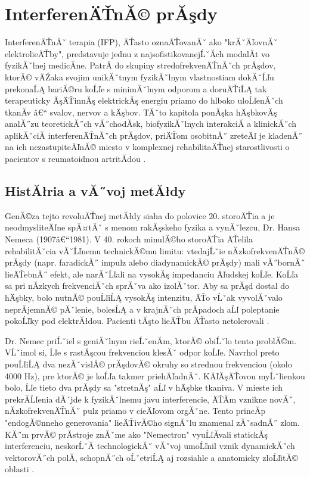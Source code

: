 ﻿\chapter{InterferenÄŤnĂ© prĂşdy}

InterferenÄŤnĂˇ terapia (IFP), ÄŤasto oznaÄŤovanĂˇ ako "krĂˇÄľovnĂˇ elektrolieÄŤby", predstavuje jednu z najsofistikovanejĹˇĂ­ch modalĂ­t vo fyzikĂˇlnej medicĂ­ne. PatrĂ­ do skupiny stredofrekvenÄŤnĂ˝ch prĂşdov, ktorĂ© vÄŹaka svojim unikĂˇtnym fyzikĂˇlnym vlastnostiam dokĂˇĹľu prekonaĹĄ bariĂ©ru koĹľe s minimĂˇlnym odporom a doruÄŤiĹĄ tak terapeuticky ĂşÄŤinnĂş elektrickĂş energiu priamo do hlboko uloĹľenĂ˝ch tkanĂ­v â€“ svalov, nervov a kÄşbov. TĂˇto kapitola ponĂşka hÄşbkovĂş analĂ˝zu teoretickĂ˝ch vĂ˝chodĂ­sk, biofyzikĂˇlnych interakciĂ­ a klinickĂ˝ch aplikĂˇciĂ­ interferenÄŤnĂ˝ch prĂşdov, priÄŤom osobitnĂ˝ zreteÄľ je kladenĂ˝ na ich nezastupiteÄľnĂ© miesto v komplexnej rehabilitaÄŤnej starostlivosti o pacientov s reumatoidnou artritĂ­dou \parencite{Capko1998}.

\section{HistĂłria a vĂ˝voj metĂłdy}

GenĂ©za tejto revoluÄŤnej metĂłdy siaha do polovice 20. storoÄŤia a je neodmysliteÄľne spĂ¤tĂˇ s menom rakĂşskeho fyzika a vynĂˇlezcu, Dr. Hansa Nemeca (1907â€“1981). V 40. rokoch minulĂ©ho storoÄŤia ÄŤelila rehabilitĂˇcia vĂˇĹľnemu technickĂ©mu limitu: vtedajĹˇie nĂ­zkofrekvenÄŤnĂ© prĂşdy (napr. faradickĂ˝ impulz alebo diadynamickĂ© prĂşdy) mali vĂ˝bornĂ˝ lieÄŤebnĂ˝ efekt, ale narĂˇĹľali na vysokĂş impedanciu Äľudskej koĹľe. KoĹľa sa pri nĂ­zkych frekvenciĂˇch sprĂˇva ako izolĂˇtor. Aby sa prĂşd dostal do hÄşbky, bolo nutnĂ© pouĹľiĹĄ vysokĂş intenzitu, ÄŤo vĹˇak vyvolĂˇvalo neprĂ­jemnĂ© pĂˇlenie, bolesĹĄ a v krajnĂ˝ch prĂ­padoch aĹľ poleptanie pokoĹľky pod elektrĂłdou. Pacienti tĂşto lieÄŤbu ÄŤasto netolerovali \parencite{Capko1998}.

Dr. Nemec priĹˇiel s geniĂˇlnym rieĹˇenĂ­m, ktorĂ© obiĹˇlo tento problĂ©m. VĹˇimol si, Ĺľe s rastĂşcou frekvenciou klesĂˇ odpor koĹľe. Navrhol preto pouĹľiĹĄ dva nezĂˇvislĂ© prĂşdovĂ© okruhy so strednou frekvenciou (okolo 4000 Hz), pre ktorĂ© je koĹľa takmer priehÄľadnĂˇ. KÄľĂşÄŤovou myĹˇlienkou bolo, Ĺľe tieto dva prĂşdy sa "stretnĂş" aĹľ v hÄşbke tkaniva. V mieste ich prekrĂ­Ĺľenia dĂ´jde k fyzikĂˇlnemu javu interferencie, ÄŤĂ­m vznikne novĂ˝, nĂ­zkofrekvenÄŤnĂ˝ pulz priamo v cieÄľovom orgĂˇne. Tento princĂ­p "endogĂ©nneho generovania" lieÄŤivĂ©ho signĂˇlu znamenal zĂˇsadnĂ˝ zlom. KĂ˝m prvĂ© prĂ­stroje znĂˇme ako "Nemectron" vyuĹľĂ­vali statickĂş interferenciu, neskorĹˇĂ­ technologickĂ˝ vĂ˝voj umoĹľnil vznik dynamickĂ˝ch vektorovĂ˝ch polĂ­, schopnĂ˝ch oĹˇetriĹĄ aj rozsiahle a anatomicky zloĹľitĂ© oblasti \parencite{Podebradsky2009, Goats1990}.


